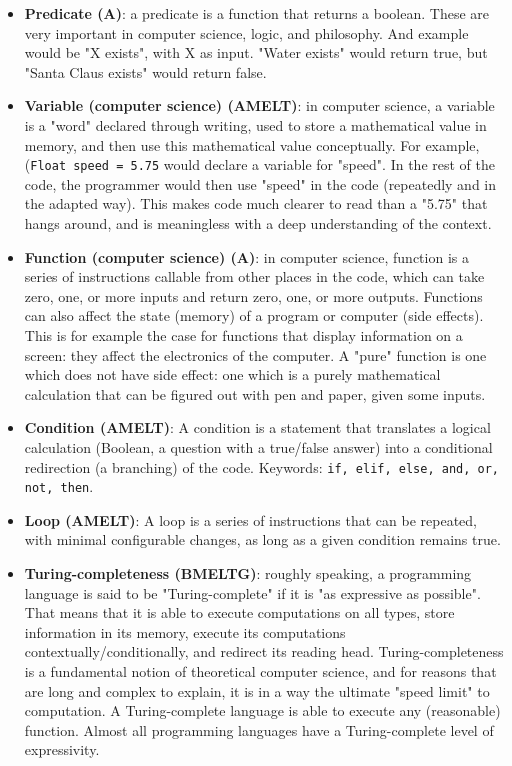 \documentclass{article}
\begin{document}
\begin{itemize}
	\item \textbf{Predicate (A)}: a predicate is a function that returns a boolean. These are very important in computer science, logic, and philosophy. And example would be "X exists", with X as input. "Water exists" would return true, but "Santa Claus exists" would return false.

	\item \textbf{Variable (computer science) (AMELT)}: in computer science, a variable is a "word" declared through writing, used to store a mathematical value in memory, and then use this mathematical value conceptually. For example, (\texttt{Float speed = 5.75} would declare a variable for "speed". In the rest of the code, the programmer would then use "speed" in the code (repeatedly and in the adapted way). This makes code much clearer to read than a "5.75" that hangs around, and is meaningless with a deep understanding of the context.

	\item \textbf{Function (computer science) (A)}: in computer science, function is a series of instructions callable from other places in the code, which can take zero, one, or more inputs and return zero, one, or more outputs. Functions can also affect the state (memory) of a program or computer (side effects). This is for example the case for functions that display information on a screen: they affect the electronics of the computer. A "pure" function is one which does not have side effect: one which is a purely mathematical calculation that can be figured out with pen and paper, given some inputs.

	\item \textbf{Condition (AMELT)}: A condition is a statement that translates a logical calculation (Boolean, a question with a true/false answer) into a conditional redirection (a branching) of the code. Keywords: \texttt{if, elif, else, and, or, not, then}.

	\item \textbf{Loop (AMELT)}: A loop is a series of instructions that can be repeated, with minimal configurable changes, as long as a given condition remains true.

	\item \textbf{Turing-completeness (BMELTG)}: roughly speaking, a programming language is said to be "Turing-complete" if it is "as expressive as possible". That means that it is able to execute computations on all types, store information in its memory, execute its computations contextually/conditionally, and redirect its reading head. Turing-completeness is a fundamental notion of theoretical computer science, and for reasons that are long and complex to explain, it is in a way the ultimate "speed limit" to computation. A Turing-complete language is able to execute any (reasonable) function. Almost all programming languages have a Turing-complete level of expressivity.


\end{itemize}
\end{document}
